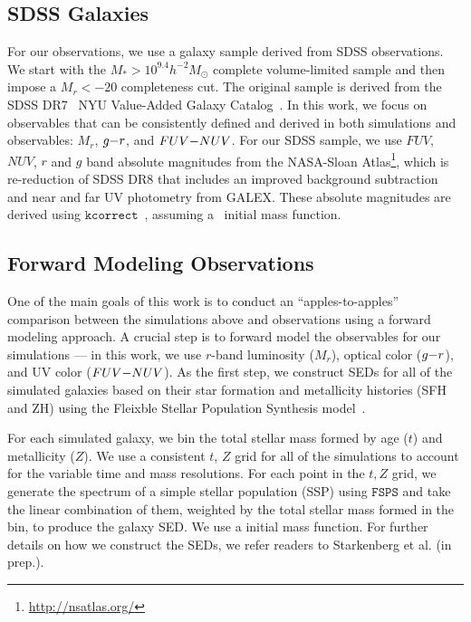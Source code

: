 \subsection{SDSS Galaxies} \label{sec:obs} 
For our observations, we use a galaxy sample derived from SDSS observations. We
start with the $M_* > 10^{9.4} h^{-2}M_\odot$ complete \cite{tinker2011}
volume-limited sample and then impose a $M_r < -20$ completeness cut. 
The original \cite{tinker2011} sample is derived from the SDSS DR7~\citep{abazajian2009} NYU
Value-Added Galaxy Catalog~\citep[VAGC;][]{blanton2005}. In this work, we focus 
on observables that can be consistently defined and derived in both simulations 
and observables: $M_r$, $g{-}r$, and $FUV{-}NUV$. For our SDSS sample, we use $FUV$,
$NUV$, $r$ and $g$ band absolute magnitudes from the NASA-Sloan
Atlas\footnote{\url{http://nsatlas.org/}}, which is re-reduction of SDSS DR8
\citep{aihara2011} that includes an improved background subtraction~\citep{blanton2011} 
and near and far UV photometry from GALEX. These absolute magnitudes are
derived using $\mathtt{kcorrect}$~\citep{blanton2007a}, assuming
a~\cite{chabrier2003} initial mass function. 

\subsection{Forward Modeling Observations} \label{sec:fm} 
One of the main goals of this work is to conduct an ``apples-to-apples'' comparison
between the simulations above and observations using a forward modeling
approach. A crucial step is to forward model the observables for our
simulations --- in this work, we use $r$-band luminosity ($M_r$), optical color ($g{-}r$), and 
UV color ($FUV{-}NUV$). As the first step, we construct SEDs for all
of the simulated galaxies based on their star formation and metallicity
histories (SFH and ZH) using the Fleixble Stellar Population Synthesis model~\citep[$\mathtt{FSPS}$;][]{conroy2009, conroy2010}. 

For each simulated galaxy, we bin the total stellar mass formed by age ($t$)
and metallicity ($Z$). We use a consistent $t$, $Z$ grid for all of the simulations
to account for the variable time and mass resolutions. For each point in the
$t, Z$ grid, we generate the spectrum of a simple stellar population (SSP)
using $\mathtt{FSPS}$ and take the linear combination of them, weighted by 
the total stellar mass formed in the bin, to produce the galaxy SED. We use a
\cite{chabrier2003} initial mass function. For further details on how we
construct the SEDs, we refer readers to Starkenberg et al. (in prep.).

